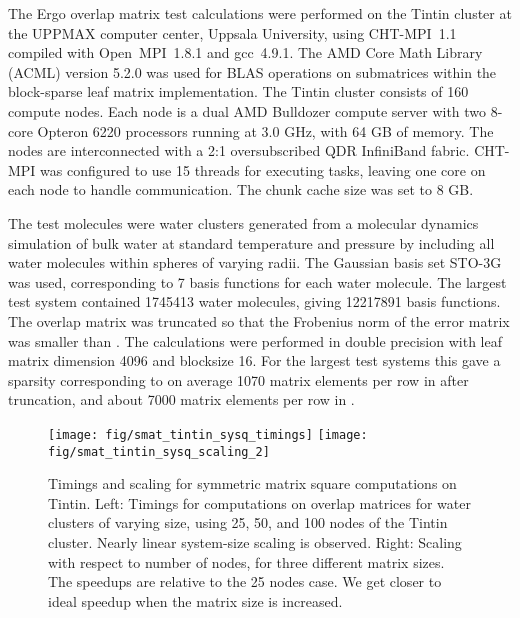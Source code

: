 \documentclass{elsarticle}
\begin{document}
The {\sc Ergo} overlap matrix test calculations were performed on the
Tintin cluster at the UPPMAX computer center, Uppsala University,
using CHT-MPI~1.1 compiled with Open~MPI~1.8.1 and gcc~4.9.1. The AMD Core Math
Library (ACML) version 5.2.0 was used for BLAS operations on
submatrices within the block-sparse leaf matrix implementation.
The Tintin cluster consists of 160 compute nodes. Each node is a
dual AMD Bulldozer compute server with two 8-core Opteron 6220
processors running at 3.0 GHz, with 64 GB of memory. The
nodes are interconnected with a 2:1 oversubscribed QDR InfiniBand
fabric.
CHT-MPI was configured to use 15 threads for executing tasks, leaving
one core on each node to handle communication. The chunk cache size
was set to 8 GB.

The test molecules were water clusters generated from a
molecular dynamics simulation of bulk water at standard temperature
and pressure by including all water molecules within spheres of
varying radii. The Gaussian basis set STO-3G was used, corresponding
to 7 basis functions for each water molecule.
The largest test system contained 1745413 water molecules, giving
12217891 basis functions.
The overlap matrix  was truncated so that the Frobenius norm of the
error matrix was smaller than .
The calculations were performed in double precision with leaf matrix
dimension 4096 and blocksize 16.
For the largest test systems this gave a sparsity corresponding to on
average 1070 matrix elements per row in  after truncation, and
about 7000 matrix elements per row in .

\begin{figure}
  \begin{center}
    \texttt{[image: fig/smat\_tintin\_sysq\_timings]}
    \texttt{[image: fig/smat\_tintin\_sysq\_scaling\_2]}
  \end{center}
  \caption{Timings and scaling for  symmetric matrix square computations on
    Tintin.  Left: Timings for  computations on
    overlap matrices for water clusters of varying size, using 25, 50,
    and 100 nodes of the Tintin cluster. Nearly linear
    system-size scaling is observed. Right: Scaling with respect to
    number of nodes, for three different matrix sizes. The speedups are
    relative to the 25 nodes case. We get closer to ideal
    speedup when the matrix size is increased.
    \label{fig:smat_tintin_sysq_timings_and_scaling_tintin}}
\end{figure}
\end{document}
